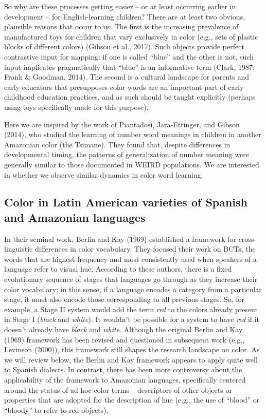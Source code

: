 \documentclass[
  english,
  ,man,floatsintext]{apa6}
\begin{document}
So why are these processes getting easier -- or at least occurring earlier in development -- for English-learning children? There are at least two obvious, plausible reasons that occur to us. The first is the increasing prevalence of manufactured toys for children that vary exclusively in color (e.g., sets of plastic blocks of different colors) (Gibson et al., 2017). Such objects provide perfect contrastive input for mapping: if one is called \enquote{blue} and the other is not, such input implicates pragmatically that \enquote{blue} is an informative term (Clark, 1987; Frank \& Goodman, 2014). The second is a cultural landscape for parents and early educators that presupposes color words are an important part of early childhood education practices, and as such should be taught explicitly (perhaps using toys specifically made for this purpose).

Here we are inspired by the work of Piantadosi, Jara‐Ettinger, and Gibson (2014), who studied the learning of number word meanings in children in another Amazonian color (the Tsimane). They found that, despite differences in developmental timing, the patterns of generalization of number meaning were generally similar to those documented in WEIRD populations. We are interested in whether we observe similar dynamics in color word learning.

\hypertarget{color-in-latin-american-varieties-of-spanish-and-amazonian-languages}{%
\subsection{Color in Latin American varieties of Spanish and Amazonian languages}\label{color-in-latin-american-varieties-of-spanish-and-amazonian-languages}}

In their seminal work, Berlin and Kay (1969) established a framework for cross-linguistic differences in color vocabulary. They focused their work on BCTs, the words that are highest-frequency and most consistently used when speakers of a language refer to visual hue. According to these authors, there is a fixed evolutionary sequence of stages that languages go through as they increase their color vocabulary; in this sense, if a language encodes a category from a particular stage, it must also encode those corresponding to all previous stages. So, for example, a Stage II system would add the term \emph{red} to the colors already present in Stage I (\emph{black} and \emph{white}). It wouldn't be possible for a system to have \emph{red} if it doesn't already have \emph{black} and \emph{white}. Although the original Berlin and Kay (1969) framework has been revised and questioned in subsequent work (e.g., Levinson (2000)), this framework still shapes the research landscape on color. As we will review below, the Berlin and Kay framework appears to apply quite well to Spanish dialects. In contrast, there has been more controversy about the applicability of the framework to Amazonian languages, specifically centered around the status of ad hoc color terms -- descriptors of other objects or properties that are adopted for the description of hue (e.g., the use of \enquote{blood} or \enquote{bloody} to refer to red objects).
\end{document}
